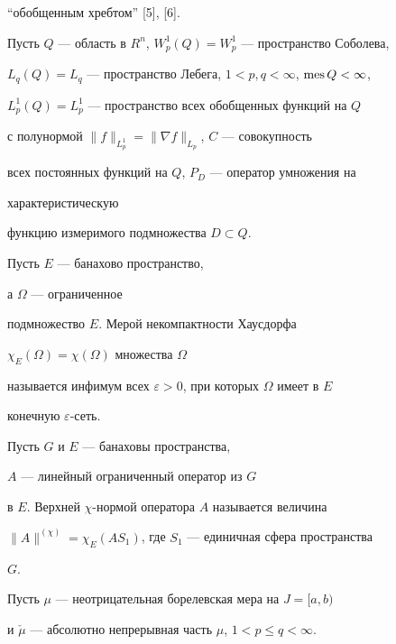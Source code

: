 ``обобщенным хребтом'' [5], [6].





Пусть $Q$ --- область в $R^n$, $W^1_p(Q)=W^1_p$ --- пространство Соболева,


$L_q(Q)=L_q$ --- пространство Лебега, $1<p,q<\infty$, $\operatorname{mes} Q<\infty$,


$L^1_p(Q)=L^1_p$ --- пространство всех обобщенных функций на $Q$


с полунормой $\|f\|_{L^1_p}=\|\nabla f\|_{L_p}$, $C$ --- совокупность


всех постоянных функций на $Q$, $P_D$ --- оператор умножения на


характеристическую


функцию измеримого подмножества $D\subset Q$.





\begin{defn}[{\myfont{}[1], [2], [7]}] Пусть $E$ --- банахово пространство,


а $\Omega$ --- ограниченное


подмножество $E$. Мерой некомпактности Хаусдорфа


$\chi_E(\Omega)=\chi(\Omega)$  множества $\Omega$


называется инфимум всех $\varepsilon>0$, при которых $\Omega$ имеет в $E$


конечную $\varepsilon$-сеть.


\end{defn}





\begin{defn}[{\myfont{}[7]}] Пусть $G$ и $E$ --- банаховы пространства,


$A$ --- линейный ограниченный оператор из $G$


в $E$. Верхней $\chi$-нормой оператора $A$ называется величина


$\|A\|^{(\chi)}=\chi_E(AS_1)$, где $S_1$ --- единичная сфера пространства


$G$.


\end{defn}





Пусть $\mu$ --- неотрицательная борелевская мера на $J=[a,b)$


и $\check\mu$ --- абсолютно непрерывная часть $\mu$, $1<p\le q<\infty$.


